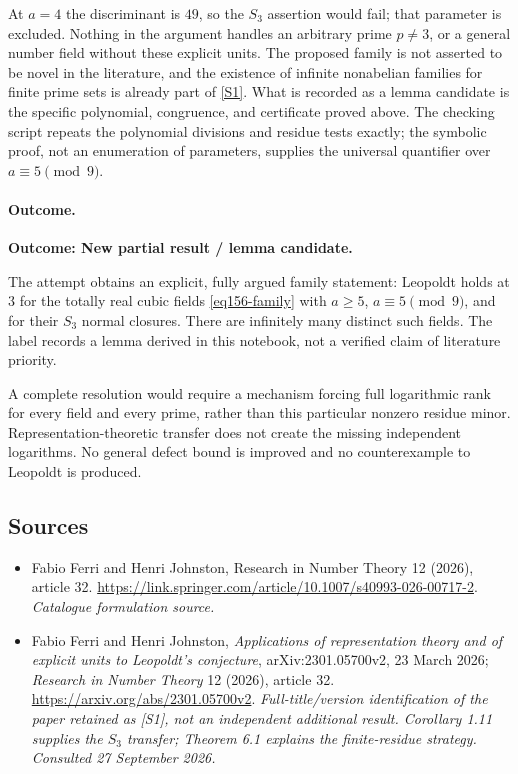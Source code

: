 \documentclass[11pt,a4paper]{article}
\newcommand{\sref}[2]{\hyperlink{source:#1:#2}{[S#2]}}
\numberwithin{equation}{section}
\begin{document}
At $a=4$ the discriminant is $49$, so the $S_3$ assertion would fail;
that parameter is excluded. Nothing in the argument handles an arbitrary
prime $p\ne3$, or a general number field without these explicit units.
The proposed family is not asserted to be novel in the literature, and the
existence of infinite nonabelian families for finite prime sets is already
part of \sref{156}{1}. What is recorded as a lemma candidate is the
specific polynomial, congruence, and certificate proved above. The checking
script repeats the polynomial divisions and residue tests exactly; the
symbolic proof, not an enumeration of parameters, supplies the universal
quantifier over $a\equiv5\pmod9$.

\paragraph{Outcome.}
\textbf{Outcome: New partial result / lemma candidate.}

The attempt obtains an explicit, fully argued family statement:
Leopoldt holds at $3$ for the totally real cubic fields
\eqref{eq156-family} with $a\ge5$, $a\equiv5\pmod9$, and for their
$S_3$ normal closures. There are infinitely many distinct such fields.
The label records a lemma derived in this notebook, not a verified claim
of literature priority.

A complete resolution would require a mechanism forcing full logarithmic
rank for every field and every prime, rather than this particular nonzero
residue minor. Representation-theoretic transfer does not create the
missing independent logarithms. No general defect bound is improved and no
counterexample to Leopoldt is produced.
\subsection{Sources}
\begin{itemize}\raggedright
\item[\textnormal{[S1]}]\hypertarget{source:156:1}{} Fabio Ferri and Henri Johnston, Research in Number Theory 12 (2026), article 32.
\url{https://link.springer.com/article/10.1007/s40993-026-00717-2}.
{\small\textit{Catalogue formulation source.}}
\item[\textnormal{[E1]}]\hypertarget{extra:156:1}{} Fabio Ferri and Henri
Johnston, \emph{Applications of representation theory and of explicit units
to Leopoldt's conjecture}, arXiv:2301.05700v2, 23 March 2026;
\emph{Research in Number Theory} 12 (2026), article 32.
\url{https://arxiv.org/abs/2301.05700v2}.
{\small\textit{Full-title/version identification of the paper retained as
[S1], not an independent additional result. Corollary 1.11 supplies the
$S_3$ transfer; Theorem 6.1 explains the finite-residue strategy.
Consulted 27 September 2026.}}
\end{itemize}
\end{document}

